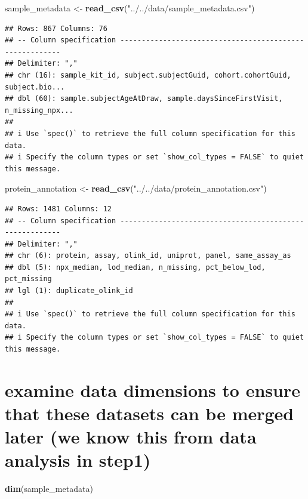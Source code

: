 \documentclass[
]{article}
\newenvironment{Shaded}{\begin{snugshade}}{\end{snugshade}}
\newcommand{\FunctionTok}[1]{\textcolor[rgb]{0.13,0.29,0.53}{\textbf{#1}}}
\newcommand{\NormalTok}[1]{#1}
\newcommand{\OtherTok}[1]{\textcolor[rgb]{0.56,0.35,0.01}{#1}}
\newcommand{\StringTok}[1]{\textcolor[rgb]{0.31,0.60,0.02}{#1}}
\begin{document}
\begin{Shaded}
\begin{Highlighting}[]
\NormalTok{sample\_metadata }\OtherTok{\textless{}{-}} \FunctionTok{read\_csv}\NormalTok{(}\StringTok{"../../data/sample\_metadata.csv"}\NormalTok{)}
\end{Highlighting}
\end{Shaded}

\begin{verbatim}
## Rows: 867 Columns: 76
## -- Column specification --------------------------------------------------------
## Delimiter: ","
## chr (16): sample_kit_id, subject.subjectGuid, cohort.cohortGuid, subject.bio...
## dbl (60): sample.subjectAgeAtDraw, sample.daysSinceFirstVisit, n_missing_npx...
## 
## i Use `spec()` to retrieve the full column specification for this data.
## i Specify the column types or set `show_col_types = FALSE` to quiet this message.
\end{verbatim}

\begin{Shaded}
\begin{Highlighting}[]
\NormalTok{protein\_annotation }\OtherTok{\textless{}{-}} \FunctionTok{read\_csv}\NormalTok{(}\StringTok{"../../data/protein\_annotation.csv"}\NormalTok{)}
\end{Highlighting}
\end{Shaded}

\begin{verbatim}
## Rows: 1481 Columns: 12
## -- Column specification --------------------------------------------------------
## Delimiter: ","
## chr (6): protein, assay, olink_id, uniprot, panel, same_assay_as
## dbl (5): npx_median, lod_median, n_missing, pct_below_lod, pct_missing
## lgl (1): duplicate_olink_id
## 
## i Use `spec()` to retrieve the full column specification for this data.
## i Specify the column types or set `show_col_types = FALSE` to quiet this message.
\end{verbatim}

\section{examine data dimensions to ensure that these datasets can be
merged later (we know this from data analysis in
step1)}\label{examine-data-dimensions-to-ensure-that-these-datasets-can-be-merged-later-we-know-this-from-data-analysis-in-step1}

\begin{Shaded}
\begin{Highlighting}[]
\FunctionTok{dim}\NormalTok{(sample\_metadata)}
\end{Highlighting}
\end{Shaded}
\end{document}
